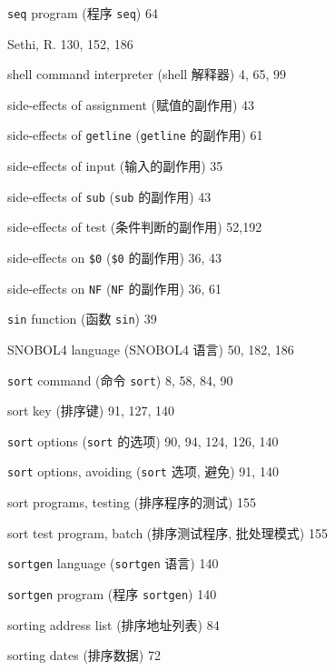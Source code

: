 \begin{multicols}{2}
\hangindent=2pc  \verb'seq' program (程序 \verb'seq') 64

\hangindent=2pc  Sethi, R. 130, 152, 186

\hangindent=2pc  shell command interpreter (shell 解释器) 4, 65, 99

\hangindent=2pc  side-effects of assignment (赋值的副作用) 43

\hangindent=2pc  side-effects of \verb'getline' (\verb'getline'
的副作用) 61

\hangindent=2pc  side-effects of input (输入的副作用) 35

\hangindent=2pc  side-effects of \verb'sub' (\verb'sub'
的副作用) 43

\hangindent=2pc  side-effects of test (条件判断的副作用) 52,192

\hangindent=2pc  side-effects on \verb'$0' (\verb'$0' 的副作用)
36, 43

\hangindent=2pc  side-effects on \verb'NF' (\verb'NF' 的副作用)
36, 61

\hangindent=2pc  \verb'sin' function (函数 \verb'sin') 39

\hangindent=2pc  SNOBOL4 language (SNOBOL4 语言) 50, 182, 186

\hangindent=2pc  \verb'sort' command (命令 \verb'sort')
8, 58, 84, 90

\hangindent=2pc  sort key (排序键) 91, 127, 140

\hangindent=2pc  \verb'sort' options (\verb'sort' 的选项)
90, 94, 124, 126, 140

\hangindent=2pc  \verb'sort' options, avoiding (\verb'sort'
选项, 避免) 91, 140

\hangindent=2pc  sort programs, testing (排序程序的测试) 155

\hangindent=2pc  sort test program, batch (排序测试程序,
批处理模式) 155

\hangindent=2pc  \verb'sortgen' language (\verb'sortgen' 语言) 140

\hangindent=2pc  \verb'sortgen' program (程序 \verb'sortgen') 140

\hangindent=2pc  sorting address list (排序地址列表) 84

\hangindent=2pc  sorting dates (排序数据) 72


\end{multicols}
